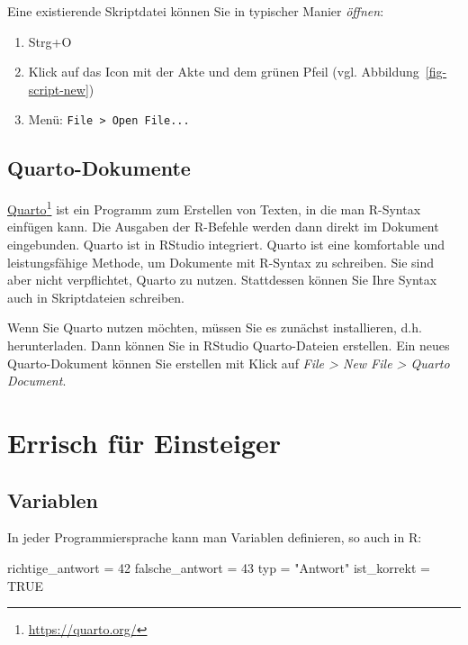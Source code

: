 \documentclass[
  letterpaper,
  oneside,
  open=any]{scrbook}
\newenvironment{Shaded}{\begin{snugshade}}{\end{snugshade}}
\newcommand{\ConstantTok}[1]{\textcolor[rgb]{0.56,0.35,0.01}{#1}}
\newcommand{\DecValTok}[1]{\textcolor[rgb]{0.68,0.00,0.00}{#1}}
\newcommand{\NormalTok}[1]{\textcolor[rgb]{0.00,0.23,0.31}{#1}}
\newcommand{\OtherTok}[1]{\textcolor[rgb]{0.00,0.23,0.31}{#1}}
\newcommand{\StringTok}[1]{\textcolor[rgb]{0.13,0.47,0.30}{#1}}
\providecommand{\tightlist}{%
  \setlength{\itemsep}{0pt}\setlength{\parskip}{0pt}}\usepackage{longtable,booktabs,array}
\theoremstyle{definition}
\theoremstyle{definition}
\theoremstyle{definition}
\theoremstyle{remark}
\begin{document}
Eine existierende Skriptdatei können Sie in typischer Manier
\emph{öffnen}:

\begin{enumerate}
\def\labelenumi{\arabic{enumi}.}
\tightlist
\item
  Strg+O
\item
  Klick auf das Icon mit der Akte und dem grünen Pfeil (vgl.
  Abbildung~\ref{fig-script-new})
\item
  Menü: \texttt{File\ \textgreater{}\ Open\ File...}
\end{enumerate}

\subsection{Quarto-Dokumente}\label{quarto-dokumente}

\href{https://quarto.org/}{Quarto}\footnote{\url{https://quarto.org/}}
ist ein Programm zum Erstellen von Texten, in die man R-Syntax einfügen
kann. Die Ausgaben der R-Befehle werden dann direkt im Dokument
eingebunden. Quarto ist in RStudio integriert. Quarto ist eine
komfortable und leistungsfähige Methode, um Dokumente mit R-Syntax zu
schreiben. Sie sind aber nicht verpflichtet, Quarto zu nutzen.
Stattdessen können Sie Ihre Syntax auch in Skriptdateien schreiben.

Wenn Sie Quarto nutzen möchten, müssen Sie es zunächst installieren,
d.h. herunterladen. Dann können Sie in RStudio Quarto-Dateien erstellen.
Ein neues Quarto-Dokument können Sie erstellen mit Klick auf \emph{File
\textgreater{} New File \textgreater{} Quarto Document}.

\section{Errisch für Einsteiger}\label{errisch-fuxfcr-einsteiger}

\subsection{Variablen}\label{sec-rvars}

In jeder Programmiersprache kann man Variablen definieren, so auch in R:

\begin{Shaded}
\begin{Highlighting}[]
\NormalTok{richtige\_antwort }\OtherTok{=} \DecValTok{42}
\NormalTok{falsche\_antwort }\OtherTok{=} \DecValTok{43}
\NormalTok{typ }\OtherTok{=} \StringTok{"Antwort"}
\NormalTok{ist\_korrekt }\OtherTok{=} \ConstantTok{TRUE}
\end{Highlighting}
\end{Shaded}
\end{document}
